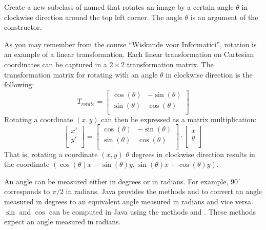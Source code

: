 \documentclass{book}
\begin{document}
\begin{exercise}
Create a new subclass of  named  that rotates an image by a certain angle $\theta$ in clockwise direction around the top left corner. The angle $\theta$ is an argument of the constructor.

As you may remember from the course ``Wiskunde voor Informatici'', rotation is an example of a linear transformation. Each linear transformation on Cartesian coordinates can be captured in a $2\times2$ transformation matrix. The transformation matrix for rotating with an angle $\theta$ in clockwise direction is the following: 
$$T_{rotate} = \begin{bmatrix}
\cos(\theta) & -\sin(\theta)\\
\sin(\theta) & \cos(\theta)\\
\end{bmatrix}$$
Rotating a coordinate $(x, y)$ can then be expressed as a matrix multiplication:
$$
\begin{bmatrix}
x'\\ y'\\ 
\end{bmatrix} = \begin{bmatrix}
\cos(\theta) & -\sin(\theta)\\
\sin(\theta) & \cos(\theta)\\
\end{bmatrix} \cdot \begin{bmatrix}
x\\ y\\
\end{bmatrix}$$
That is, rotating a coordinate $(x, y)$ $\theta$ degrees in clockwise direction results in the coordinate $(\cos(\theta) x - \sin(\theta) y, \sin(\theta) x + \cos(\theta) y)$.

An angle can be measured either in degrees or in radians. For example, $90^{\circ}$ corresponds to $\pi/2$ in radians. Java provides the methods  and  to convert an angle measured in degrees to an equivalent angle measured in radians and vice versa.  $\sin$ and $\cos$ can be computed in Java using the methods  and . These methods expect an angle measured in radians.


\end{exercise}
\end{document}

